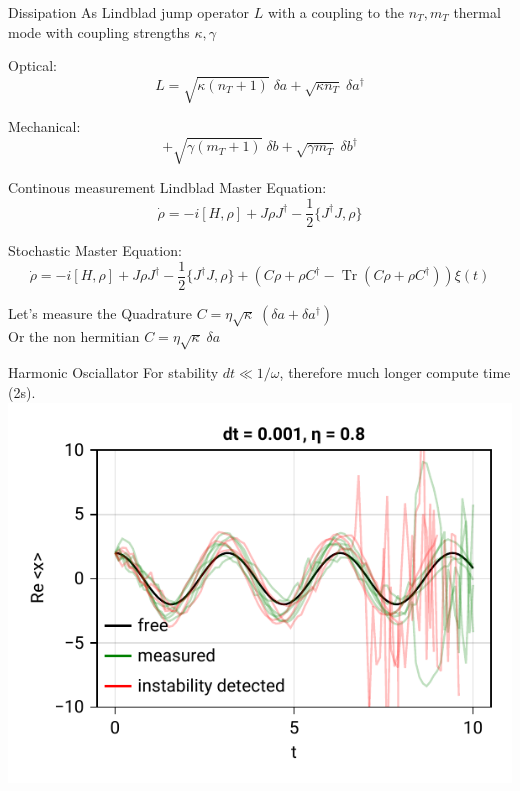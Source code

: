 \documentclass{beamer}
\DeclareMathOperator{\Tr}{Tr}
\begin{document}
\begin{frame}{Dissipation}
	As Lindblad jump operator $L$ with a coupling to the $n_T, m_T$ thermal mode with coupling strengths $\kappa, \gamma$

	Optical:
	$$L = \sqrt{\kappa (n_T+1)} \;\delta a 
		+ \sqrt{\kappa n_T} \; \delta a^\dagger$$
	
	Mechanical:
	$$
		+ \sqrt{\gamma (m_T+1)} \;\delta b 
		+ \sqrt{\gamma m_T} \; \delta b^\dagger
	$$
\end{frame}

\begin{frame}{Continous measurement}
	\textcolor{seegrau}{
		Lindblad Master Equation:
		$$\dot\rho = -i[H,\rho] + J\rho J^\dagger - \frac{1}{2} \{J^\dagger J, \rho\}$$
	}

	Stochastic Master Equation:
	$$
		\dot\rho 
		= -i[H,\rho] 
		+ J\rho J^\dagger - \frac{1}{2} \{J^\dagger J, \rho\} 
		+ \left(C\rho + \rho C^\dagger - \Tr(C\rho + \rho C^\dagger)\right)\xi(t)
	$$

	Let's measure the Quadrature $C = \eta\sqrt{\kappa}\;(\delta a + \delta a^\dagger)$\\
	Or the non hermitian $C = \eta \sqrt{\kappa}\; \delta a$

\end{frame}

\begin{frame}{Harmonic Osciallator}
	For stability $dt \ll 1/\omega$, therefore much longer compute time (2s).
	\includegraphics{figures/03 harmonic oscillator.pdf}
\end{frame}
\end{document}
